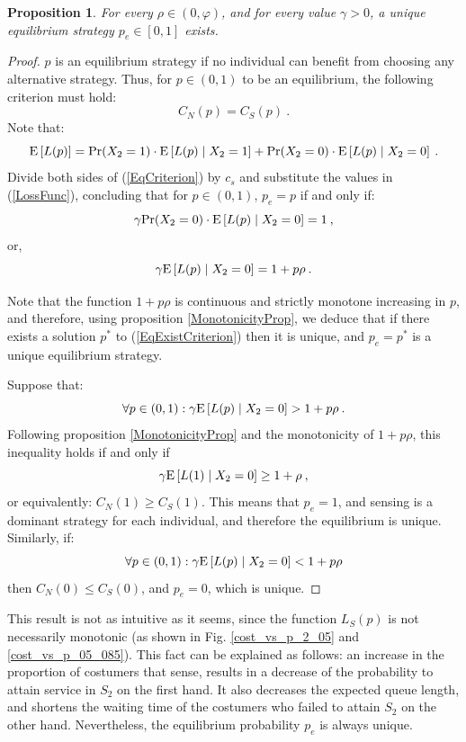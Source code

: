 \documentclass[11pt]{article}
\numberwithin{equation}{section}
\newtheorem{proposition}{Proposition}[section]
\newcommand{\pr}{{\rm Pr}}
\newcommand{\e}{{\rm E}}
\begin{document}
\begin{proposition} For every $\rho\in(0,\varphi)$, and for every value $\gamma>0$, a unique equilibrium strategy $p_{e}\in[0,1]$ exists.
\end{proposition}

\begin{proof}

$p$ is an equilibrium strategy if no individual can benefit from choosing any alternative strategy. Thus, for $p \in (0,1)$ to be an equilibrium, the following criterion must hold: 
\begin{equation}
C_{N}(p)=C_{S}(p)\:. \label{EqCriterion}
\end{equation}
Note that:
\[ \e\left[L(p)\right] = \pr(X_2=1) \cdot \e\left[L(p)\mid X_2=1\right] + \pr(X_2=0) \cdot \e\left[L(p)\mid X_2=0\right] \:. \]
Divide both sides of (\ref{EqCriterion}) by $c_{s}$ and substitute the values in (\ref{LossFunc}), concluding that for $p \in (0,1)$, $p_{e} = p$ if and only if:
\begin{equation}
\gamma \pr(X_2=0) \cdot \e\left[L(p)\mid X_2=0\right] = 1\:, 
\end{equation}
or,
\begin{equation}
\gamma \e\left[L(p)\mid X_2=0\right]=1+p\rho\:. \label{EqExistCriterion}
\end{equation}

Note that the function $1+p\rho$ is continuous and strictly monotone increasing in $p$, and therefore, using proposition \ref{MonotonicityProp}, we deduce that if there exists a solution $p^*$ to (\ref{EqExistCriterion}) then it is unique, and $p_e = p^*$ is a unique equilibrium strategy. 

Suppose that:
\[ \forall p \in (0,1): \gamma \e\left[L(p)\mid X_2=0\right] > 1+p\rho \:.\] 
Following proposition \ref{MonotonicityProp} and the monotonicity of $1+p\rho$, this inequality holds if and only if \[ \gamma \e\left[L(1)\mid X_2=0\right] \geq 1+\rho \:,\] or equivalently: $C_{N}(1) \geq C_{S}(1)$. This means that $p_{e}=1$, and sensing is a dominant strategy for each individual, and therefore the equilibrium is unique. Similarly, if: 
\[ \forall p \in (0,1): \gamma \e\left[L(p)\mid X_2=0\right] < 1+p\rho \] 
then $C_{N}(0) \leq C_{S}(0)$, and $p_{e}=0$, which is unique.
\end{proof}

This result is not as intuitive as it seems, since the function $L_{S}(p)$ is not necessarily monotonic (as shown in Fig. \ref{cost_vs_p_2_05} and \ref{cost_vs_p_05_085}). This fact can be explained as follows: an increase in the proportion of costumers that sense, results in a decrease of the probability to attain service in $S_{2}$ on the first hand. It also decreases the expected queue length, and shortens the waiting time of the costumers who failed to attain $S_{2}$ on the other hand. Nevertheless, the equilibrium probability $p_{e}$ is always unique.
\end{document}
